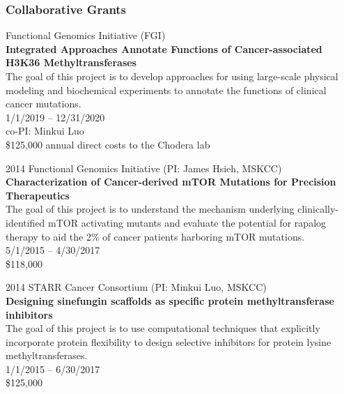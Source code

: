 \documentclass[10pt]{article}
\begin{document}
\color{black}

\subsubsection*{Collaborative Grants}

Functional Genomics Initiative (FGI)  \\
{\bf Integrated Approaches Annotate Functions of Cancer-associated H3K36 Methyltransferases} \\
The goal of this project is to develop approaches for using large-scale physical modeling and biochemical experiments to annotate the functions of clinical cancer mutations.\\
1/1/2019 -- 12/31/2020 \\
co-PI: Minkui Luo \\
\$125,000 annual direct costs to the Chodera lab

\vspace{1.5ex}

2014 Functional Genomics Initiative (PI: James Hsieh, MSKCC) \\
{\bf Characterization of Cancer-derived mTOR Mutations for Precision Therapeutics} \\
The goal of this project is to understand the mechanism underlying clinically-identified mTOR activating mutants and evaluate the potential for rapalog therapy to aid the 2\% of cancer patients harboring mTOR mutations. \\
5/1/2015 -- 4/30/2017 \\
\$118,000
\color{black}

\vspace{1.5ex}

2014 STARR Cancer Consortium (PI: Minkui Luo, MSKCC) \\
{\bf Designing sinefungin scaffolds as specific protein methyltransferase inhibitors} \\
The goal of this project is to use computational techniques that explicitly incorporate protein flexibility to design selective inhibitors for protein lysine methyltransferases. \\
1/1/2015 -- 6/30/2017 \\
\$125,000
\color{black}

\eject

\end{document}
